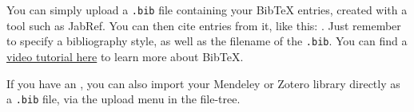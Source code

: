 \documentclass{article}
\begin{document}
You can simply upload a \verb|.bib| file containing your BibTeX entries, created with a tool such as JabRef. You can then cite entries from it, like this: \cite{greenwade93}. Just remember to specify a bibliography style, as well as the filename of the \verb|.bib|. You can find a \href{https://www.overleaf.com/help/97-how-to-include-a-bibliography-using-bibtex}{video tutorial here} to learn more about BibTeX.

If you have an , you can also import your Mendeley or Zotero library directly as a \verb|.bib| file, via the upload menu in the file-tree.



\end{document}

